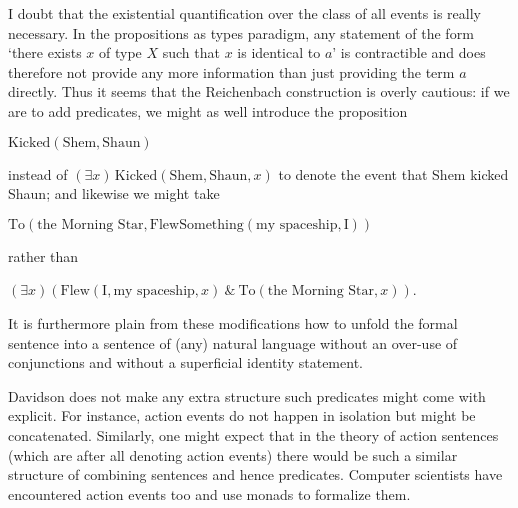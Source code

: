 \documentclass{article}
\begin{document}
I doubt that the existential quantification over the class of all events is 
really necessary. In the propositions as types paradigm, any statement of the 
form `there exists $x$ of type $X$ such that $x$ is identical to $a$' is
contractible and does therefore not provide any more information than just 
providing the term $a$ directly. Thus it seems that the Reichenbach construction
is overly cautious: if we are to add predicates, we might as well introduce the
proposition
\begin{center}
$\text{Kicked}(\text{Shem},\text{Shaun})$
\end{center}
instead of $(\exists x)\,\text{Kicked}(\text{Shem},\text{Shaun},x)$ to denote the event that
Shem kicked Shaun; and likewise we might take
\begin{center}
$\text{To}(\text{the Morning Star},
\text{FlewSomething}(\text{my spaceship},\text{I}))$
\end{center}
rather than
\begin{center}
$(\exists x) (\text{Flew}(\text{I},\text{my spaceship},x)\ \&\ \text{To}(\text{the
Morning Star},x))$.
\end{center}
It is furthermore plain from these modifications how to unfold the formal
sentence into a sentence of (any) natural language without an over-use of
conjunctions and without a superficial identity statement.

Davidson does not make any extra structure such predicates might come with 
explicit. For instance, action events do not happen in isolation but might be 
concatenated. Similarly,
one might expect that in the theory of action sentences (which are after all
denoting action events) there would be such a similar structure of combining
sentences and hence predicates. Computer scientists have encountered action 
events too and use monads to formalize them. 
\end{document}
